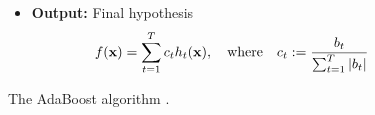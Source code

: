 \begin{figure}[bth]
\begin{center}
\begin{center}
{{\begin{itemize}
\begin{enumerate}
            \end{enumerate}
          \item[]{\bf Output:} Final hypothesis
            \begin{equation}
              \label{fin_hyp}
              f({\bf x}) = \sum_{t=1}^{T} c_t h_{t}({\bf x}), \quad \mbox{where} \quad c_t:=\frac{b_t}{\sum_{t=1}^T |b_t|}
            \end{equation}
          \end{itemize}
          } 
          }
    \end{center}
  \end{center}
  \caption[]{The AdaBoost algorithm \cite{Freund99ashort}.\label{fig:ABALG}}
\end{figure}


